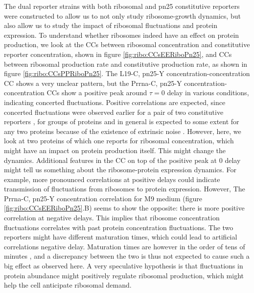 The dual reporter strains with both ribosomal and pn25 constitutive reporters were constructed to allow us to not only study ribosome-growth dynamics, but also allow us to study the impact of ribosomal fluctuations and protein expression.
%
To understand whether ribosomes indeed have an effect on protein production, we look at the CCs between ribosomal concentration and constitutive reporter concentration, shown in figure \ref{fig:ribo:CCsEERiboPn25}, and CCs between ribosomal production rate and constitutive production rate, as shown in figure \ref{fig:ribo:CCsPPRiboPn25}.
%
The L19-C, pn25-Y concentration-concentration CC shows a very unclear pattern, 
but the Prrna-C, pn25-Y concentration-concentration CCs show a positive peak around $\tau = 0$ delay in various conditions, indicating concerted fluctuations.
%
Positive correlations are expected, since concerted fluctuations were observed earlier for a pair of two constitutive reporters \cite{Elowitz2002}, for groups of proteins \cite{Stewart-Ornstein2012} and in general is expected to some extent for any two proteins because of the existence of extrinsic noise \cite{Chalancon2012}.
%
However, here, we look at two proteins of which one reports for ribosomal concentration, which might have an impact on protein production itself.
This might change the dynamics.
%
Additional features in the CC on top of the positive peak at 0 delay might tell us something about the ribosome-protein expression dynamics.
For example, more pronounced correlations at positive delays could indicate transmission of fluctuations from ribosomes to protein expression.
%
However, The Prrna-C, pn25-Y concentration correlation for M9 medium (figure \ref{fig:ribo:CCsEERiboPn25}.B) seems to show the opposite: there is more positive correlation at negative delays.
This implies that ribosome concentration fluctuations correlates with past protein concentration fluctuations.
%
The two reporters might have different maturation times, which could lead to artificial correlations negative delay.
%
Maturation times are however in the order of tens of minutes \cite{Iizuka2011, Walker2016t}, and a discrepancy between the two is thus not expected to cause such a big effect as observed here.
%
A very speculative hypothesis is that 
fluctuations in protein abundance might positively regulate ribosomal production,
which might help the cell anticipate ribosomal demand.%

